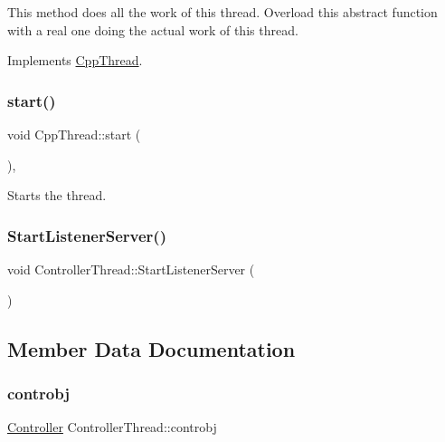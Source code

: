 This method does all the work of this thread. Overload this abstract function with a real one doing the actual work of this thread. 

Implements \hyperlink{classCppThread_a792b79e72250710147c452648def4a78}{Cpp\+Thread}.

\mbox{\label{classCppThread_a1be46d1be000f41a763289300623c609}} 
\subsubsection{\texorpdfstring{start()}{start()}}
{\footnotesize\ttfamily void Cpp\+Thread\+::start (\begin{DoxyParamCaption}{ }\end{DoxyParamCaption})\hspace{0.3cm}{\ttfamily [inline]}, {\ttfamily [inherited]}}

Starts the thread. \mbox{\label{classControllerThread_a362c7faaf16d2556fc11ed30d571b8f3}} 
\subsubsection{\texorpdfstring{Start\+Listener\+Server()}{StartListenerServer()}}
{\footnotesize\ttfamily void Controller\+Thread\+::\+Start\+Listener\+Server (\begin{DoxyParamCaption}{ }\end{DoxyParamCaption})\hspace{0.3cm}{\ttfamily [private]}}



\subsection{Member Data Documentation}
\mbox{\label{classControllerThread_ae37e5312460cff540a7749057db5c265}} 
\subsubsection{\texorpdfstring{controbj}{controbj}}
{\footnotesize\ttfamily \hyperlink{classController}{Controller} Controller\+Thread\+::controbj\hspace{0.3cm}{\ttfamily [private]}}

